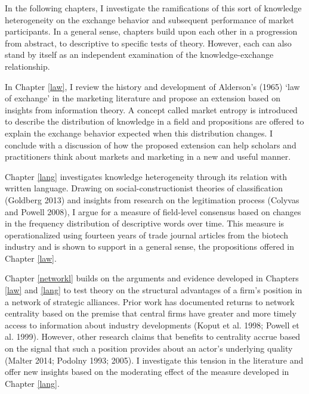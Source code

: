 In the following chapters, I investigate the ramifications of this sort of knowledge heterogeneity on the exchange behavior and subsequent performance of market participants. In a general sense, chapters build upon each other in a progression from abstract, to descriptive to specific tests of theory. However, each can also stand by itself as an independent examination of the knowledge-exchange relationship. 

In Chapter \ref{law}, I review the history and development of Alderson's (1965) `law of exchange' in the marketing literature and propose an extension based on insights from information theory. A concept called market entropy is introduced to describe the distribution of knowledge in a field and propositions are offered to explain the exchange behavior expected when this distribution changes. I conclude with a discussion of how the proposed extension can help scholars and practitioners think about markets and marketing in a new and useful manner. 

Chapter \ref{lang} investigates knowledge heterogeneity through its relation with written language. Drawing on social-constructionist theories of classification (Goldberg 2013) and insights from research on the legitimation process (Colyvas and Powell 2008), I argue for a measure of field-level consensus based on changes in the frequency distribution of descriptive words over time. This measure is operationalized using fourteen years of trade journal articles from the biotech industry and is shown to support in a general sense, the propositions offered in Chapter \ref{law}. 

Chapter \ref{networkl} builds on the arguments and evidence developed in Chapters \ref{law} and \ref{lang} to test theory on the structural advantages of a firm's position in a network of strategic alliances. Prior work has documented returns to network centrality based on the premise that central firms have greater and more timely access to information about industry developments (Koput et al. 1998; Powell et al. 1999). However, other research claims that benefits to centrality accrue based on the signal that such a position provides about an actor's underlying quality (Malter 2014; Podolny 1993; 2005). I investigate this tension in the literature and offer new insights based on the moderating effect of the measure developed in Chapter \ref{lang}.

